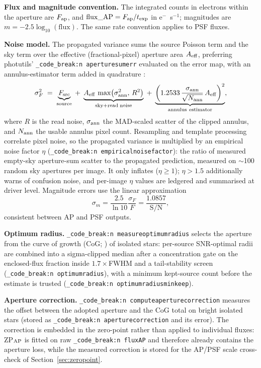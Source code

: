 \documentclass[11pt,a4paper]{article}
\renewcommand{\_}{\autophotunderscore\allowbreak}
\DeclareRobustCommand{\code}[1]{\texttt{\autophot_code_break:n {#1}}}
\begin{document}
\textbf{Flux and magnitude convention.} The integrated counts in
electrons within the aperture are $F_{\rm ap}$, and
$\mathrm{flux\_AP}=F_{\rm ap}/t_{\rm exp}$ in e$^-$~s$^{-1}$; magnitudes
are $m=-2.5\log_{10}(\mathrm{flux})$. The same rate convention applies to
PSF fluxes.

\textbf{Noise model.} The propagated variance sums the source Poisson
term and the sky term over the effective (fractional-pixel) aperture area
$A_{\rm eff}$, preferring photutils' \code{aperture\_sum\_err} evaluated
on the error map, with an annulus-estimator term added in quadrature
\citep{stetson1987daophot}:
\begin{equation}
\sigma_F^2 \;=\; \underbrace{F_{\rm src}}_{\rm source}
\;+\; \underbrace{A_{\rm eff}\,\max\!\big(\sigma_{\rm ann}^2,\,R^2\big)}_{\rm sky+read\;noise}
\;+\; \underbrace{\left(1.2533\,\frac{\sigma_{\rm ann}}{\sqrt{N_{\rm ann}}}\,A_{\rm eff}\right)^{2}}_{\rm annulus\ estimator},
\end{equation}
where $R$ is the read noise, $\sigma_{\rm ann}$ the MAD-scaled scatter of
the clipped annulus, and $N_{\rm ann}$ the usable annulus pixel count.
Resampling and template processing correlate pixel noise, so the
propagated variance is multiplied by an empirical noise factor $\eta$
(\code{empirical\_noise\_factor}): the ratio of measured empty-sky
aperture-sum scatter to the propagated prediction, measured on
$\sim$100 random sky apertures per image. It only inflates
($\eta\ge1$); $\eta>1.5$ additionally warns of confusion noise, and
per-image $\eta$ values are ledgered and summarised at driver level.
Magnitude errors use the linear approximation
\begin{equation}
\sigma_m = \frac{2.5}{\ln 10}\frac{\sigma_F}{F} = \frac{1.0857}{\mathrm{S/N}},
\end{equation}
consistent between AP and PSF outputs.

\textbf{Optimum radius.} \code{measure\_optimum\_radius} selects the
aperture from the curve of growth (CoG; \citealp{stetson1990growth}) of
isolated stars: per-source SNR-optimal radii \citep{howell1989snr} are
combined into a sigma-clipped median after a
concentration gate on the enclosed-flux fraction inside
$1.7\times$FWHM and a tail-stability screen
(\code{optimum\_radius\_*}), with a minimum kept-source count before the
estimate is trusted (\code{optimum\_radius\_min\_keep\_*}).

\textbf{Aperture correction.} \code{compute\_aperture\_correction}
measures the offset between the adopted aperture and the CoG total on
bright isolated stars (stored as \code{aperture\_correction} and its
error). The correction is embedded in the zero-point rather than applied
to individual fluxes: ZP$_{\rm AP}$ is fitted on raw \code{flux\_AP} and
therefore already contains the aperture loss, while the measured
correction is stored for the AP/PSF scale cross-check of
Section~\ref{sec:zeropoint}.
\end{document}
